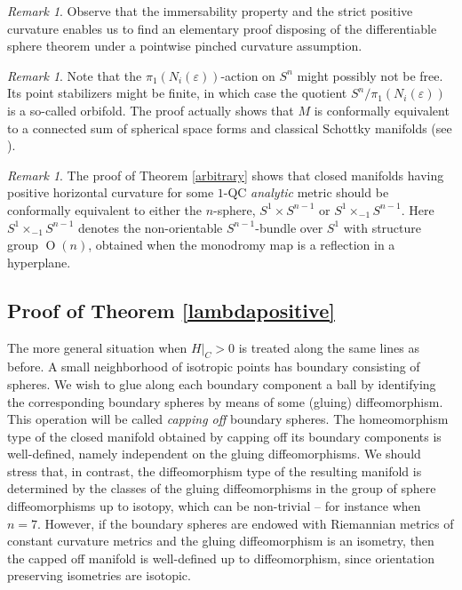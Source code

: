 \documentclass[10pt]{amsart}
\DeclareMathOperator{\rO}{O}
\theoremstyle{definition}
\theoremstyle{remark}
\newtheorem{remark}[theorem]{Remark}
\numberwithin{equation}{section}
\begin{document}
\begin{remark}
Observe that the immersability property and
the strict positive curvature enables
us to find an elementary proof disposing
of the differentiable sphere theorem under
a pointwise pinched curvature assumption.
\end{remark}

\begin{remark}
Note that the $\pi_1(N_i(\varepsilon))$-action on $S^n$ might possibly not be free.
Its point stabilizers might be finite, in which case the quotient $S^n/\pi_1(N_i(\varepsilon))$ is a so-called orbifold.
The proof actually shows that $M$ is conformally equivalent
to a connected sum of spherical space forms and classical Schottky
manifolds (see \cite{Pi}).
\end{remark}

\begin{remark}
The proof of Theorem \ref{arbitrary} shows that closed manifolds having
positive horizontal curvature for some $1$-QC
\emph{analytic} metric should be conformally equivalent to either
the $n$-sphere, $S^1\times S^{n-1}$ or $S^1\times_{-1}S^{n-1}$.
Here $S^1\times_{-1}S^{n-1}$ denotes the non-orientable $S^{n-1}$-bundle
over $S^1$ with structure group $\rO(n)$, \ie obtained when the monodromy map
is a reflection in a hyperplane.
\end{remark}

\subsection{Proof of Theorem \ref{lambdapositive}}
The more general situation when $H|_C>0$ is treated along the same lines as before.
A small neighborhood of isotropic points has boundary consisting of spheres.
We wish to glue along each boundary component a ball by identifying the corresponding boundary spheres
by means of some (gluing) diffeomorphism. This operation will be called \emph{capping off} boundary spheres.
The homeomorphism type of the closed manifold obtained by capping off its boundary components is well-defined,
namely independent on the gluing diffeomorphisms. We should stress that, in contrast, the diffeomorphism type of
the resulting manifold is determined by the classes of the gluing diffeomorphisms
in the group of sphere diffeomorphisms up to isotopy, which can be non-trivial -- for instance when $n=7$.
However, if the boundary spheres are endowed with Riemannian metrics of constant curvature metrics
and the gluing diffeomorphism is an isometry, then the capped off manifold is well-defined up to diffeomorphism, since
orientation preserving isometries are isotopic.
\end{document}
